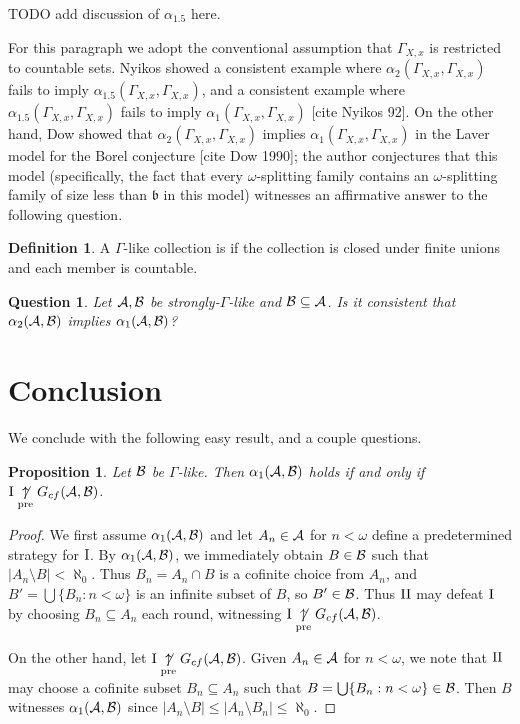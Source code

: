 \documentclass{amsart}
\theoremstyle{plain}
\newtheorem{proposition}[theorem]{Proposition}
\newtheorem{question}[theorem]{Question}
\theoremstyle{definition}
\newtheorem{definition}[theorem]{Definition}
\theoremstyle{remark}
\theoremstyle{plain}
\theoremstyle{definition}
\theoremstyle{remark}
\begin{document}
TODO add discussion of \(\alpha_{1.5}\) here.

For this paragraph we adopt the conventional assumption that
\(\Gamma_{X,x}\) is restricted to countable sets.
Nyikos showed a consistent example
where \(\alpha_2(\Gamma_{X,x},\Gamma_{X,x})\) fails to imply
\(\alpha_{1.5}(\Gamma_{X,x},\Gamma_{X,x})\), and a consistent example where
\(\alpha_{1.5}(\Gamma_{X,x},\Gamma_{X,x})\) fails to imply
\(\alpha_{1}(\Gamma_{X,x},\Gamma_{X,x})\) [cite Nyikos 92].
On the other hand, Dow showed that \(\alpha_2(\Gamma_{X,x},\Gamma_{X,x})\)
implies \(\alpha_{1}(\Gamma_{X,x},\Gamma_{X,x})\) in the Laver model
for the Borel conjecture [cite Dow 1990]; the author conjectures
that this model (specifically, the fact that
every \(\omega\)-splitting family contains an \(\omega\)-splitting
family of size less than \(\mathfrak b\) in this model) witnesses
an affirmative answer to the following question.

\begin{definition}
A \(\Gamma\)-like collection is 
if the collection is closed under finite unions and each member
is countable.
\end{definition}

\begin{question}
Let \(\mathcal{A},\mathcal{B}\) be strongly-\(\Gamma\)-like
and \(\mathcal{B}\subseteq\mathcal{A}\).
Is it consistent that \(\alpha_2(\mathcal{A},\mathcal{B})\)
implies \(\alpha_1(\mathcal{A},\mathcal{B})\)?
\end{question}


\section{Conclusion}

We conclude with the following easy result, and a couple questions.

\begin{proposition}
Let \(\mathcal{B}\) be \(\Gamma\)-like. Then \(\alpha_1(\mathcal{A},\mathcal{B})\) holds if and only
if \(\mathrm{I}\underset{\text{pre}}{\not\uparrow} G_{cf}(\mathcal{A},\mathcal{B})\).
\end{proposition}

\begin{proof}
We first assume \(\alpha_1(\mathcal{A},\mathcal{B})\) and let \(A_n\in\mathcal{A}\) for \(n<\omega\)
define a predetermined strategy for \(\mathrm{I}\). By \(\alpha_1(\mathcal{A},\mathcal{B})\), we
immediately obtain \(B\in\mathcal{B}\) such that \(|A_n\setminus B|<\aleph_0\). Thus
\(B_n=A_n\cap B\) is a cofinite choice from \(A_n\), and 
\(B'=\bigcup\{B_n:n<\omega\}\) is an infinite subset of \(B\),
so \(B'\in\mathcal{B}\). Thus \(\mathrm{II}\) may defeat \(\mathrm{I}\) by choosing
\(B_n\subseteq A_n\) each round, witnessing \(\mathrm{I}\underset{\text{pre}}{\not\uparrow} G_{cf}(\mathcal{A},\mathcal{B})\).

On the other hand, let \(\mathrm{I}\underset{\text{pre}}{\not\uparrow} G_{cf}(\mathcal{A},\mathcal{B})\). Given \(A_n\in\mathcal{A}\)
for \(n<\omega\), we note that \(\mathrm{II}\) may choose a cofinite subset \(B_n\subseteq A_n\)
such that \(B=\bigcup\{B_n:n<\omega\}\in\mathcal{B}\). Then \(B\) witnesses \(\alpha_1(\mathcal{A},\mathcal{B})\)
since \(|A_n\setminus B|\leq|A_n\setminus B_n|\leq\aleph_0\).
\end{proof}
\end{document}
